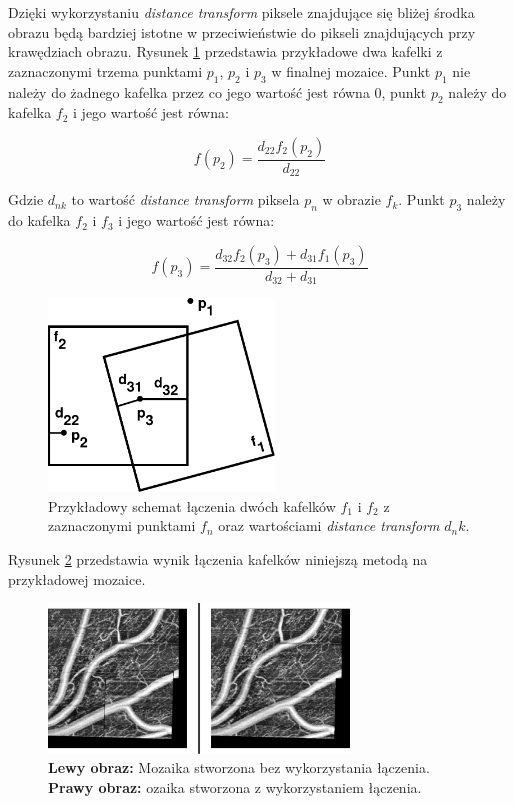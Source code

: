 Dzięki wykorzystaniu \textit{distance transform} piksele znajdujące się bliżej środka obrazu będą bardziej istotne w przeciwieństwie do pikseli znajdujących przy krawędziach obrazu. Rysunek \ref{fig:proponowane_algorytmy:blend} przedstawia przykładowe dwa kafelki z zaznaczonymi trzema punktami $p_1$, $p_2$ i $p_3$ w finalnej mozaice. Punkt $p_1$ nie należy do żadnego kafelka przez co jego wartość jest równa $0$, punkt $p_2$ należy do kafelka $f_2$ i jego wartość jest równa:

\begin{equation}
f(p_2) = \frac{d_{22}f_2(p_2)}{d_{22}}
\end{equation}

Gdzie $d_{nk}$ to wartość \textit{distance transform} piksela $p_n$ w obrazie $f_k$. Punkt $p_3$ należy do kafelka $f_2$ i $f_3$ i jego wartość jest równa:

\begin{equation}
f(p_3) = \frac{d_{32}f_2(p_3) + d_{31}f_1(p_3)}{d_{32} + d_{31}}
\end{equation}

\begin{figure}[H]
  \centering
  \includegraphics[width=6cm]{gfx/blend}
  \caption{Przykładowy schemat łączenia dwóch kafelków $f_1$ i $f_2$ z zaznaczonymi punktami $f_n$ oraz wartościami \textit{distance transform} $d_nk$.}
  \label{fig:proponowane_algorytmy:blend}
\end{figure}

Rysunek \ref{fig:proponowane_algorytmy:blend_eff} przedstawia wynik łączenia kafelków niniejszą metodą na przykładowej mozaice.

\begin{figure}[H]
  \centering
  \includegraphics[width=8cm]{gfx/blend_eff}
  \caption{\textbf{Lewy obraz:} Mozaika stworzona bez wykorzystania łączenia. \textbf{Prawy obraz:} ozaika stworzona z wykorzystaniem łączenia.}
  \label{fig:proponowane_algorytmy:blend_eff}
\end{figure}
